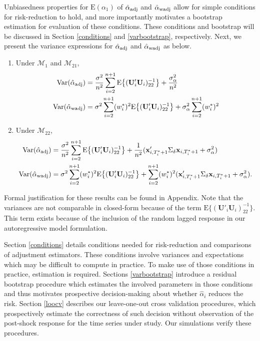 \documentclass[11pt]{article}
\def\mbf#1{\mathbf{#1}} %
\def\mrm#1{\mathrm{#1}} %
\def\mc#1{\mathcal{#1}} %
\def\E#1{\mathrm{E}(#1)} %
\def\var#1{\mathrm{Var}(#1)} %
\theoremstyle{definition}
\begin{document}
Unbiasedness properties for $\E{\alpha_1}$ of $\hat{\alpha}_{\rm adj}$ and $\hat{\alpha}_{\rm wadj}$ allow for simple conditions for risk-reduction to hold, and more importantly motivates a bootstrap estimation for evaluation of these conditions. %
These conditions and bootstrap will be discussed in Section \ref{conditions} and \ref{varbootstrap}, respectively. Next, we present the variance expressions for $\hat{\alpha}_{\rm adj}$ and $\hat{\alpha}_{\rm wadj}$ as below.

\begin{enumerate}[label = (\roman*)]
  \item Under $\mc{M}_1$ and $\mc{M}_{21}$,  
\begin{align*}
  \var{\hat{\alpha}_{\rm adj}} 
  &=\frac{\sigma^2}{n^2}\sum_{i=2}^{n+1}\mrm{E}\big\{(\mbf{U}'_i\mbf{U}_i)^{-1}_{22}\big\}+\frac{\sigma^2_{\alpha}}{n^2}\\
\var{\hat{\alpha}_{\rm wadj}}  &= \sigma^2\sum_{i=2}^{n+1}(w_i^*)^2\mrm{E}\big\{(\mbf{U}'_i\mbf{U}_i)^{-1}_{22}\big\}+\sigma^2_{\alpha}\sum_{i=2}^{n+1}(w_i^*)^2
\end{align*}
\item Under $\mc{M}_{22}$, 
\begin{align*}
\var{\hat{\alpha}_{\rm adj}} 
  &=\frac{\sigma^2}{n^2}\sum_{i=2}^{n+1}\mrm{E}\big\{(\mbf{U}'_i\mbf{U}_i)^{-1}_{22}\big\}+\frac{1}{n^2}(\mbf{x}_{i, T_i^*+1}'\Sigma_{\delta}\mbf{x}_{i, T_i^*+1} + \sigma^2_{\alpha})\\
  \var{\hat{\alpha}_{\rm wadj}} 
  &= \sigma^2\sum_{i=2}^{n+1}(w_i^*)^2\mrm{E}\big\{(\mbf{U}'_i\mbf{U}_i)^{-1}_{22}\big\}
  + \sum_{i=2}^{n+1} (w_i^*)^2 (\mbf{x}_{i, T_i^*+1}'\Sigma_{\delta}\mbf{x}_{i, T_i^*+1} + \sigma^2_{\alpha}).
\end{align*}
\end{enumerate}
Formal justification for these results can be found in Appendix. Note that the variances are not comparable in closed-form %
because of the term $\mrm{E}\big\{(\mbf{U}'_i\mbf{U}_i)^{-1}_{22}\big\}$.  This term exists because of the inclusion of the random lagged response in our autoregressive model formulation.   



Section \ref{conditions} details conditions needed for risk-reduction and comparisons of adjustment estimators. These conditions involve variances and expectations which may be difficult to compute in practice. To make use of those conditions in practice, estimation is required. Sections \ref{varbootstrap} introduce a residual bootstrap procedure which estimates the involved parameters in those conditions and thus motivates prospective decision-making about whether $\hat{\alpha}_i$ reduces the risk. Section \ref{loocv} describes our leave-one-out cross validation procedures, which prospectively estimate the correctness of such decision without observation of the post-shock response for the time series under study. Our simulations verify these procedures. 
\end{document}
